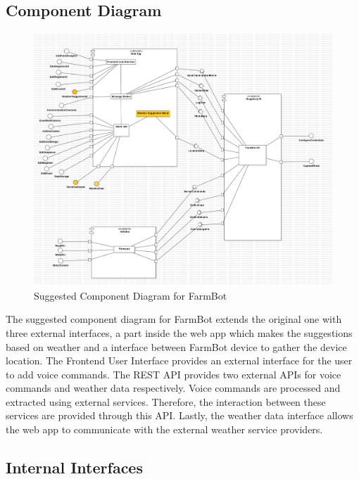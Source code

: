 \subsection{Component Diagram}

\begin{figure}[H]
    \centering
    \includegraphics[width=1\textwidth]{Figures/ComponentDiagramSuggestions.png}
    \caption{Suggested Component Diagram for FarmBot}\label{fig:suggested_component_diagram}
\end{figure}

The suggested component diagram for FarmBot extends the original one with three external interfaces, a part inside the web app which makes the suggestions based on weather and a interface between FarmBot device to gather the device location. The Frontend User Interface provides an external interface for the user to add voice commands. The REST API provides two external APIs for voice commands and weather data respectively. Voice commands are processed and extracted using external services. Therefore, the interaction between these services are provided through this API. Lastly, the weather data interface allows the web app to communicate with the external weather service providers.

\subsection{Internal Interfaces}


